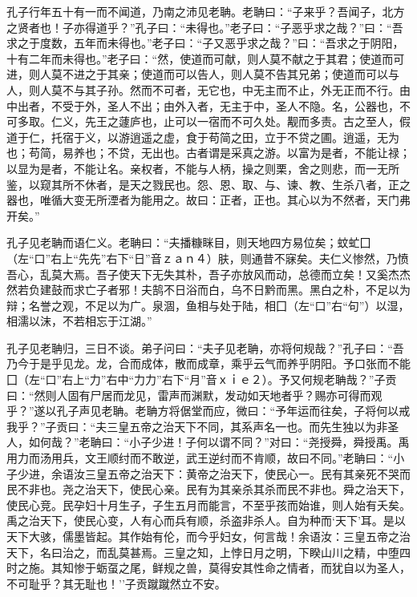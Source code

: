 \documentclass[]{article}
\begin{document}
孔子行年五十有一而不闻道，乃南之沛见老聃。老聃曰：``子来乎？吾闻子，北方之贤者也！子亦得道乎？''孔子曰：``未得也。''老子曰：``子恶乎求之哉？''曰：``吾求之于度数，五年而未得也。''老子曰：``子又恶乎求之哉？''曰：``吾求之于阴阳，十有二年而未得也。''老子曰：``然，使道而可献，则人莫不献之于其君；使道而可进，则人莫不进之于其亲；使道而可以告人，则人莫不告其兄弟；使道而可以与人，则人莫不与其子孙。然而不可者，无它也，中无主而不止，外无正而不行。由中出者，不受于外，圣人不出；由外入者，无主于中，圣人不隐。名，公器也，不可多取。仁义，先王之蘧庐也，止可以一宿而不可久处。觏而多责。古之至人，假道于仁，托宿于义，以游逍遥之虚，食于苟简之田，立于不贷之圃。逍遥，无为也；苟简，易养也；不贷，无出也。古者谓是采真之游。以富为是者，不能让禄；以显为是者，不能让名。亲权者，不能与人柄，操之则栗，舍之则悲，而一无所鉴，以窥其所不休者，是天之戮民也。怨、恩、取、与、谏、教、生杀八者，正之器也，唯循大变无所湮者为能用之。故曰：正者，正也。其心以为不然者，天门弗开矣。''

孔子见老聃而语仁义。老聃曰：``夫播糠眯目，则天地四方易位矣；蚊虻囗（左``口''右上``先先''右下``日''音ｚａｎ４）肤，则通昔不寐矣。夫仁义惨然，乃愤吾心，乱莫大焉。吾子使天下无失其朴，吾子亦放风而动，总德而立矣！又奚杰杰然若负建鼓而求亡子者邪！夫鹄不日浴而白，乌不日黔而黑。黑白之朴，不足以为辩；名誉之观，不足以为广。泉涸，鱼相与处于陆，相囗（左``口''右``句''）以湿，相濡以沫，不若相忘于江湖。''

孔子见老聃归，三日不谈。弟子问曰：``夫子见老聃，亦将何规哉？''孔子曰：``吾乃今于是乎见龙。龙，合而成体，散而成章，乘乎云气而养乎阴阳。予口张而不能囗（左``口''右上``力''右中``力力''右下``月''音ｘｉｅ２）。予又何规老聃哉？''子贡曰：``然则人固有尸居而龙见，雷声而渊默，发动如天地者乎？赐亦可得而观乎？''遂以孔子声见老聃。老聃方将倨堂而应，微曰：``予年运而往矣，子将何以戒我乎？''子贡曰：``夫三皇五帝之治天下不同，其系声名一也。而先生独以为非圣人，如何哉？''老聃曰：``小子少进！子何以谓不同？''对曰：``尧授舜，舜授禹。禹用力而汤用兵，文王顺纣而不敢逆，武王逆纣而不肯顺，故曰不同。''老聃曰：``小子少进，余语汝三皇五帝之治天下：黄帝之治天下，使民心一。民有其亲死不哭而民不非也。尧之治天下，使民心亲。民有为其亲杀其杀而民不非也。舜之治天下，使民心竞。民孕妇十月生子，子生五月而能言，不至乎孩而始谁，则人始有夭矣。禹之治天下，使民心变，人有心而兵有顺，杀盗非杀人。自为种而`天下'耳。是以天下大骇，儒墨皆起。其作始有伦，而今乎妇女，何言哉！余语汝：三皇五帝之治天下，名曰治之，而乱莫甚焉。三皇之知，上悖日月之明，下睽山川之精，中堕四时之施。其知惨于蛎虿之尾，鲜规之兽，莫得安其性命之情者，而犹自以为圣人，不可耻乎？其无耻也！''子贡蹴蹴然立不安。
\end{document}
